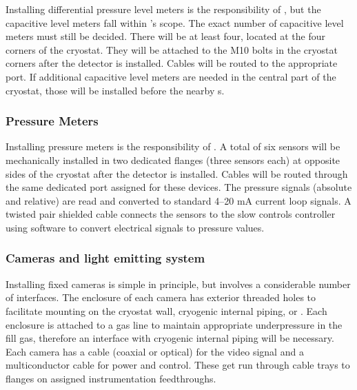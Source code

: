 Installing differential pressure level meters is the responsibility of , but the capacitive level meters fall within 's scope. The exact number of capacitive level meters must still be decided. There will be at least four, located at the four corners of the cryostat. 
They will be attached to the M10 bolts in the cryostat corners after the detector is installed. Cables will be routed to the appropriate  port. If additional capacitive level meters are needed in the central part of the cryostat, those will be installed before the nearby s. 

\subsubsection{Pressure Meters}
\label{sec:fdgen-slow-cryo-install-press}
Installing pressure meters is the responsibility of . A total of six sensors will be mechanically installed in two dedicated flanges (three sensors each) at opposite sides of the cryostat after the detector is installed. Cables will be routed through the same dedicated port assigned for these devices. The pressure signals (absolute and relative) are read and converted to
standard 4--20 mA current loop signals.
A twisted pair shielded cable connects the sensors to the slow controls  controller using software to convert electrical signals to pressure values.

\subsubsection{Cameras and light emitting system}
\label{sec:fdgen-slow-cryo-install-c}

Installing fixed cameras is simple in principle, but involves a
considerable number of interfaces. The enclosure of each camera has
exterior threaded holes to facilitate mounting on the cryostat wall,
cryogenic internal piping, or . Each
enclosure %
is attached to a gas line to maintain appropriate
underpressure in the fill gas, %
therefore an interface with cryogenic
internal piping will be necessary. Each camera has a cable (coaxial or
optical) for the video signal and a multiconductor cable for power and
control. These %
get run through cable trays to flanges on assigned
instrumentation feedthroughs.

